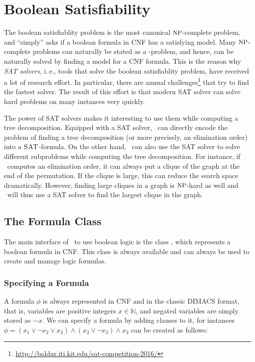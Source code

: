 \documentclass[a4paper, ukenglish, twoside, openright]{jdrasilmanual}
\begin{document}
\chapter{Boolean Satisfiability}\label{upgrade:sat}
The boolean satisfiablity problem  is the most canonical
$\Class{NP}$-complete problem, and ``simply'' asks if a boolean
formula in CNF has a satisfying model. Many $\Class{NP}$-complete
problems can naturally be stated as a -problem, and hence, can
be naturally solved by finding a model for a CNF formula. This is the
reason why \emph{SAT solvers}, i.\,e., tools that solve the boolean
satisfiablity problem, have received a lot of research effort. In
particular, there are annual challenges\footnote{\url{http://baldur.iti.kit.edu/sat-competition-2016/}} that try to
find the fastest solver. The result of this effort is that modern
SAT solver can solve hard problems on many instances very quickly.

The power of SAT solvers makes it interesting to use them while
computing a tree decomposition. Equipped with a SAT solver, \Jdrasil\
can directly encode the problem of finding a tree decomposition (or
more precisely, an elimination order) into a $\Lang{SAT}$-formula. On the other hand, \Jdrasil\ can
also use the SAT solver to solve different subproblems while computing
the tree decomposition. For instance, if \Jdrasil\ computes an
elimination order, it can always put a clique of the graph at the
end of the permutation. If the clique is large, this can reduce the
search space dramatically. However, finding large cliques in a graph is
$\Class{NP}$-hard as well and \Jdrasil\ will thus use a SAT solver to find the
largest clique in the graph.

\section{The Formula Class}\label{section:satFormula}
The main interface of \Jdrasil\ to use boolean logic is the class
\JClass{jdrasil.sat.Formula}, which represents a boolean formula in
CNF. This class is always available and can always be used to create
and manage logic formulas. 

\subsection{Specifying a Formula}
A formula $\phi$ is always represented in CNF and in the classic
DIMACS format, that is, variables are positive integers
$x\in\mathbb{N}$, and negated variables are simply stored as $-x$. We
can specify a formula by adding clauses to it, for instances
$\phi=(x_1\vee\neg x_2\vee x_3)\wedge(x_2\vee\neg x_3)\wedge x_3$ can
be created as follows:
\end{document}
